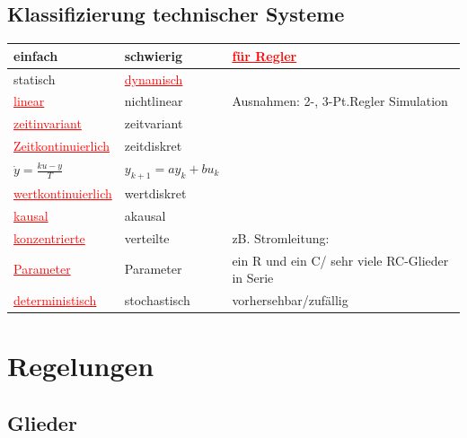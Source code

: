 	\subsection{Klassifizierung technischer Systeme}	
		\begin{tabular}{|l | l | l|}
        	\hline
        	einfach					&	schwierig			&	\textcolor{red}{\underline{für Regler}}\\
        	\hline
        	\hline
        	statisch				&	\textcolor{red}{\underline{dynamisch}}	&	\\
        	\hline
        	\textcolor{red}{\underline{linear}}			&	nichtlinear			&	Ausnahmen: 2-, 3-Pt.Regler
        	Simulation\\ 
        	\hline
        	\textcolor{red}{\underline{zeitinvariant}}	&	zeitvariant&\\
        	\hline
        	\textcolor{red}{\underline{Zeitkontinuierlich}}&	zeitdiskret	&\\
        	$\dot{y}=\frac{ku-y}{T}$&	$y_{k+1}=a y_k + b u_k$	&\\
        	\hline
        	\textcolor{red}{\underline{wertkontinuierlich}}&	wertdiskret&\\
        	\hline
        	\textcolor{red}{\underline{kausal}}			&	akausal	&\\
        	\hline
        	\textcolor{red}{\underline{konzentrierte}}	&	verteilte			&	zB. Stromleitung: \\
        	\textcolor{red}{\underline{Parameter}}		&	Parameter			&	ein R und ein C/ sehr viele
        	RC-Glieder in Serie\\
        	\hline
        	\textcolor{red}{\underline{deterministisch}}	&	stochastisch		&	vorhersehbar/zufällig\\
        	\hline
        \end{tabular}	
\newpage

\section{Regelungen}
\subsection{Glieder }


